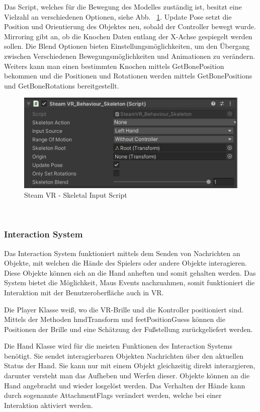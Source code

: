 \begin{itemize}
Das Script, welches für die Bewegung des Modelles zuständig ist, besitzt eine Vielzahl an verschiedenen Optionen, siehe Abb. ~\ref{fig:steamvr_skeletal_input_Script}.
Update Pose setzt die Position und Orientierung des Objektes neu, sobald der Controller bewegt wurde.
Mirroring gibt an, ob die Knochen Daten entlang der X-Achse gespiegelt werden sollen.
Die Blend Optionen bieten Einstellungsmöglichkeiten, um den Übergang zwischen Verschiedenen Bewegungsmöglichkeiten und Animationen zu verändern.
Weiters kann man einen bestimmten Knochen mittels GetBonePosition bekommen und die Positionen und Rotationen werden mittels GetBonePositions und GetBoneRotations bereitgestellt.
\begin {figure}
    \centering
    \includegraphics[scale=1]{pics/steamVR_skeletal_input_script}
    \caption{Steam VR - Skeletal Input Script}
    \label{fig:steamvr_skeletal_input_Script}
\end {figure}
~\cite{SteamVR_Skeleton_Input_2022}

\subsubsection{Interaction System}
Das Interaction System funktioniert mittels dem Senden von Nachrichten an Objekte, mit welchen die Hände des Spielers oder andere Objekte interagieren.
Diese Objekte können sich an die Hand anheften und somit gehalten werden.
Das System bietet die Möglichkeit, Maus Events nachzuahmen, somit funktioniert die Interaktion mit der Benutzeroberfläche auch in VR.

Die Player Klasse weiß, wo die VR-Brille und die Kontroller positioniert sind.
Mittels der Methoden hmdTransform und feetPositionGuess können die Positionen der Brille und eine Schätzung der Fußstellung zurückgeliefert werden.

Die Hand Klasse wird für die meisten Funktionen des Interaction Systems benötigt.
Sie sendet interagierbaren Objekten Nachrichten über den aktuellen Status der Hand.
Sie kann nur mit einem Objekt gleichzeitig direkt interargieren, darunter versteht man das Aufheben und Werfen dieser.
Objekte können an die Hand angebracht und wieder losgelöst werden.
Das Verhalten der Hände kann durch sogenannte AttachmentFlags verändert werden, welche bei einer Interaktion aktiviert werden.


\end{itemize}
